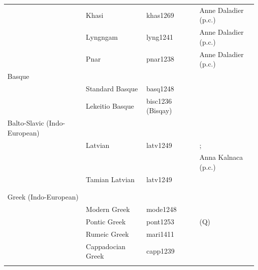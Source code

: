 \documentclass[output=collectionpaper]{langsci/langscibook}
\begin{document}
\begin{table}[htp!]
\begin{tabular}{llll}
&Khasi&khas1269 & Anne Daladier (p.c.)\\
&Lyngngam& lyng1241 & Anne Daladier (p.c.)\\
&Pnar&pnar1238 & Anne Daladier (p.c.)\\
\midrule
Basque && & \\
&Standard Basque&basq1248 & \citet{Hualde2003}\\
&Lekeitio Basque&bisc1236 (Bisqay) & \citet{Hualde1994}\\
\midrule
Balto-Slavic (Indo-European) &&&\\
& Latvian&latv1249 & \citet{Balode2001};\\
&&& Anna Kalnaca (p.c.)\\
& Tamian Latvian&latv1249&\citet{Balode2001} \\
&&&\citet{Koptjevskaja-Tamm2001}\\
&&& \citet{Thomason2015}\\
\midrule
Greek (Indo-European) &&&\\
&Modern Greek&mode1248 & \citet{Karatsareas2009,Karatsareas2014} \\
&Pontic Greek & pont1253 & \citet{Karatsareas2009,Karatsareas2014} (Q)\\
&Rumeic Greek &mari1411 & \citet{Karatsareas2009,Karatsareas2014} \\
&Cappadocian Greek& capp1239 & \citet{Karatsareas2009,Karatsareas2014} \\
 \lspbottomrule
 \end{tabular}
 \end{table}
\end{document}

